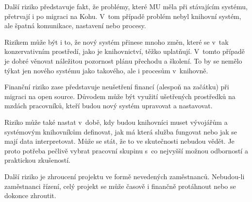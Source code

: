 \documentclass[
	11pt, oneside, printed, final, palatino, monochrome
	microtype,
	table,   %
	lof,     %
	lot     %
]{fithesis3}
\begin{document}
{Další riziko představuje fakt, že problémy, které MU měla při stávajícím systému, přetrvají i po migraci na Kohu. V~tom případě problém nebyl knihovní systém, ale špatná komunikace, nastavení nebo procesy.

Rizikem může být i to, že nový systém přinese mnoho změn, které se v~tak konzervativním prostředí, jako je knihovnictví, těžko uplatňují. V~tomto případě je dobré věnovat náležitou pozornost plánu přechodu a školení. To by se nemělo týkat jen nového systému jako takového, ale i procesům v~knihovně.

Finanční riziko zase představuje neušetření financí (alespoň na začátku) při migraci na open source. Důvodem může být využití ušetřených prostředků na mzdách pracovníků, kteří budou nový systém upravovat a nastavovat. 

Riziko může také nastat v~době, kdy budou knihovníci muset vývojářům a systémovým knihovníkům definovat, jak má která služba fungovat nebo jak se mají data interpretovat. Může se stát, že to ve skutečnosti nebudou vědět. Je proto potřeba pečlivě vybrat pracovní skupinu s~co nejvyšší možnou odborností a praktickou zkušeností.

Další riziko je zhroucení projektu ve formě nevedených zaměstnanců. Nebudou-li zaměstnanci řízení, celý projekt se může časově i finančně protáhnout nebo se dokonce zhroutit.

}
\end{document}
